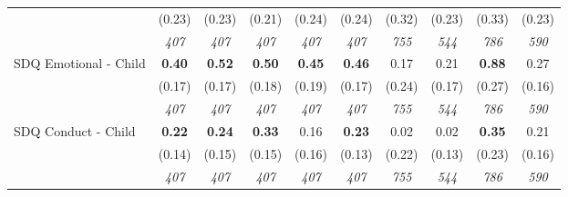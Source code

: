 \begin{tabular}{l c c c c c c c c c}
& (0.23) & (0.23) & (0.21) & (0.24) & (0.24) & (0.32) & (0.23) & (0.33) & (0.23) \\
& \textit{ 407 } & \textit{ 407 } & \textit{ 407 } & \textit{ 407 } & \textit{ 407 } & \textit{ 755 } & \textit{ 544 } & \textit{ 786 } & \textit{ 590 } \\
SDQ Emotional - Child & \textbf{ 0.40 } & \textbf{ 0.52 } & \textbf{ 0.50 } & \textbf{0.45} & \textbf{0.46} & 0.17 & 0.21 & \textbf{ 0.88 } & 0.27 \\
& (0.17) & (0.17) & (0.18) & (0.19) & (0.17) & (0.24) & (0.17) & (0.27) & (0.16) \\
& \textit{ 407 } & \textit{ 407 } & \textit{ 407 } & \textit{ 407 } & \textit{ 407 } & \textit{ 755 } & \textit{ 544 } & \textit{ 786 } & \textit{ 590 } \\
SDQ Conduct - Child & \textbf{ 0.22 } & \textbf{ 0.24 } & \textbf{ 0.33 } & 0.16 & \textbf{0.23} & 0.02 & 0.02 & \textbf{ 0.35 } & 0.21 \\
& (0.14) & (0.15) & (0.15) & (0.16) & (0.13) & (0.22) & (0.13) & (0.23) & (0.16) \\
& \textit{ 407 } & \textit{ 407 } & \textit{ 407 } & \textit{ 407 } & \textit{ 407 } & \textit{ 755 } & \textit{ 544 } & \textit{ 786 } & \textit{ 590 } \\
\bottomrule
\end{tabular}
